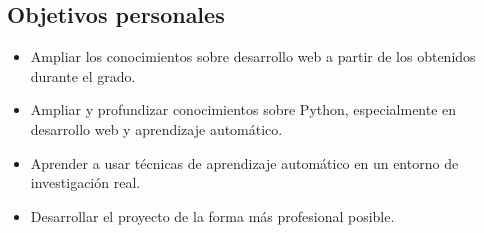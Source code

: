 \subsection{Objetivos personales}
\begin{itemize}
	\tightlist
	\item Ampliar los conocimientos sobre desarrollo web a partir de los obtenidos
	durante el grado.
	\item Ampliar y profundizar conocimientos sobre Python, especialmente en
	desarrollo web y aprendizaje automático.
	\item Aprender a usar técnicas de aprendizaje automático en un entorno de
	investigación real.
	\item Desarrollar el proyecto de la forma más profesional posible.
\end{itemize}
